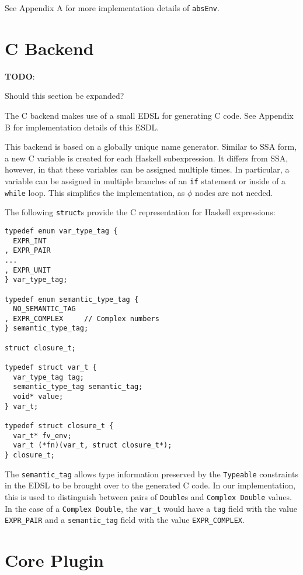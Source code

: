 \documentclass[sigplan,anonymous,review]{acmart}
\newcommand{\ttt}{\texttt}
\newenvironment{todo}
  {\begin{tcolorbox}
   \textbf{TODO}:
  }
  {\end{tcolorbox}
  }
\begin{document}
See Appendix A for more implementation details of \ttt{absEnv}.


\section{C Backend}
\begin{todo}
  Should this section be expanded?
\end{todo}

The C backend makes use of a small EDSL for generating C code. See
Appendix B for implementation details of this ESDL.

This backend is based on a globally unique name generator. Similar to
SSA form, a new C variable is created for each Haskell subexpression.
It differs from SSA, however, in that these variables can be assigned multiple
times. In particular, a variable can be assigned in multiple branches of
an \ttt{if} statement or inside of a \ttt{while} loop. This simplifies
the implementation, as $\phi$ nodes are not needed.

The following \ttt{struct}s provide the C representation for Haskell expressions:

\begin{lstlisting}
typedef enum var_type_tag {
  EXPR_INT
, EXPR_PAIR
...
, EXPR_UNIT
} var_type_tag;

typedef enum semantic_type_tag {
  NO_SEMANTIC_TAG
, EXPR_COMPLEX     // Complex numbers
} semantic_type_tag;

struct closure_t;

typedef struct var_t {
  var_type_tag tag;
  semantic_type_tag semantic_tag;
  void* value;
} var_t;

typedef struct closure_t {
  var_t* fv_env;
  var_t (*fn)(var_t, struct closure_t*);
} closure_t;
\end{lstlisting}

The \ttt{semantic\_tag} allows type information preserved by the \ttt{Typeable} constraints
in the EDSL to be brought over to the generated C code. In our implementation, this is
used to distinguish between pairs of \ttt{Double}s and \ttt{Complex Double} values. In the
case of a \ttt{Complex Double}, the \ttt{var\_t} would have a \ttt{tag} field with the value
\ttt{EXPR\_PAIR} and a \ttt{semantic\_tag} field with the value \ttt{EXPR\_COMPLEX}.

\section{Core Plugin}
\end{document}
